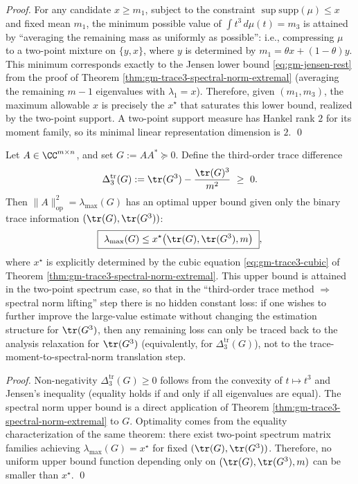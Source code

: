 \begin{proof}
For any candidate \(x\ge m_1\), subject to the constraint \(\sup\mathrm{supp}(\mu)\le x\) and fixed mean \(m_1\),
the minimum possible value of \(\int t^3\,d\mu(t)=m_3\) is attained by ``averaging the remaining mass as uniformly as possible'': i.e., compressing \(\mu\) to a two-point mixture on \(\{y,x\}\), where \(y\) is determined by \(m_1=\theta x+(1-\theta)y\).
This minimum corresponds exactly to the Jensen lower bound \eqref{eq:gm-jensen-rest} from the proof of Theorem \ref{thm:gm-trace3-spectral-norm-extremal} (averaging the remaining \(m-1\) eigenvalues with \(\lambda_1=x\)).
Therefore, given \((m_1,m_3)\), the maximum allowable \(x\) is precisely the \(x^\star\) that saturates this lower bound, realized by the two-point support.
A two-point support measure has Hankel rank \(2\) for its moment family, so its minimal linear representation dimension is \(2\). \qed
\end{proof}

\begin{proposition}\label{prop:gm-trace3-gap-optimal-spectralization}
Let \(A\in\CC^{m\times n}\), and set \(G:=AA^\ast\succeq 0\).
Define the third-order trace difference
\[
\Delta^{\mathrm{tr}}_3(G):=\tr(G^3)-\frac{\tr(G)^3}{m^2}\ \ge\ 0.
\]
Then \(\|A\|_{\mathrm{op}}^2=\lambda_{\max}(G)\) has an optimal upper bound given only the binary trace information \((\tr(G),\tr(G^3))\):
\[
\boxed{\ \lambda_{\max}(G)\le x^\star\bigl(\tr(G),\tr(G^3),m\bigr)\ },
\]
where \(x^\star\) is explicitly determined by the cubic equation \eqref{eq:gm-trace3-cubic} of Theorem \ref{thm:gm-trace3-spectral-norm-extremal}.
This upper bound is attained in the two-point spectrum case, so that in the ``third-order trace method \(\Rightarrow\) spectral norm lifting'' step there is no hidden constant loss: if one wishes to further improve the large-value estimate without changing the estimation structure for \(\tr(G^3)\), then any remaining loss can only be traced back to the analysis relaxation for \(\tr(G^3)\) (equivalently, for \(\Delta^{\mathrm{tr}}_3(G)\)), not to the trace-moment-to-spectral-norm translation step.
\end{proposition}

\begin{proof}
Non-negativity \(\Delta^{\mathrm{tr}}_3(G)\ge 0\) follows from the convexity of \(t\mapsto t^3\) and Jensen's inequality (equality holds if and only if all eigenvalues are equal).
The spectral norm upper bound is a direct application of Theorem \ref{thm:gm-trace3-spectral-norm-extremal} to \(G\).
Optimality comes from the equality characterization of the same theorem: there exist two-point spectrum matrix families achieving \(\lambda_{\max}(G)=x^\star\) for fixed \((\tr(G),\tr(G^3))\).
Therefore, no uniform upper bound function depending only on \((\tr(G),\tr(G^3),m)\) can be smaller than \(x^\star\). \qed
\end{proof}

